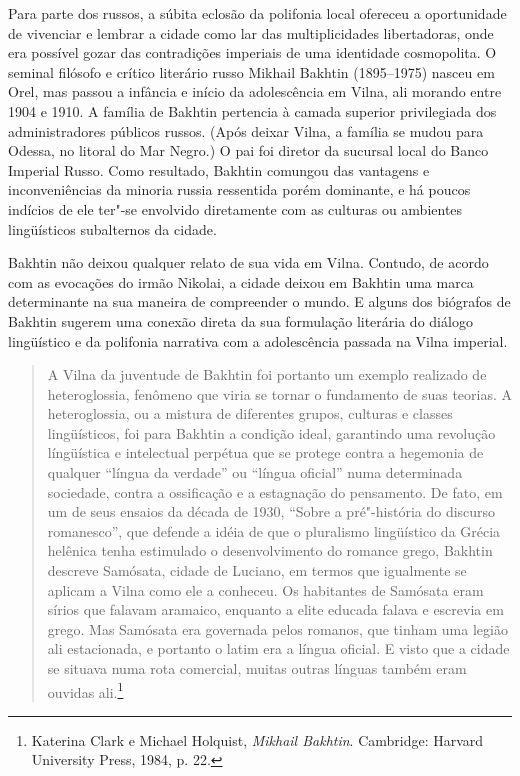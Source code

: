 Para parte dos russos, a súbita eclosão da polifonia local ofereceu a
oportunidade de vivenciar e lembrar a cidade como lar das
multiplicidades libertadoras, onde era possível gozar das contradições
imperiais de uma identidade cosmopolita. O seminal filósofo e crítico
literário russo Mikhail Bakhtin (1895--1975) nasceu em Orel, mas passou a
infância e início da adolescência em Vilna, ali morando entre 1904 e
1910. A família de Bakhtin pertencia à camada superior privilegiada dos
administradores públicos russos. (Após deixar Vilna, a família se mudou
para Odessa, no litoral do Mar Negro.) O pai foi diretor da sucursal
local do Banco Imperial Russo. Como resultado, Bakhtin comungou das
vantagens e inconveniências da minoria russia ressentida porém
dominante, e há poucos indícios de ele ter"-se envolvido diretamente com
as culturas ou ambientes lingüísticos subalternos da cidade.

Bakhtin não deixou qualquer relato de sua vida em Vilna. Contudo, de
acordo com as evocações do irmão Nikolai, a cidade deixou em Bakhtin uma
marca determinante na sua maneira de compreender o mundo. E alguns dos
biógrafos de Bakhtin sugerem uma conexão direta da sua formulação
literária do diálogo lingüístico e da polifonia narrativa com a
adolescência passada na Vilna imperial.

\begin{quote}
A Vilna da juventude de Bakhtin foi portanto um exemplo realizado de
heteroglossia, fenômeno que viria se tornar o fundamento de suas
teorias. A heteroglossia, ou a mistura de diferentes grupos, culturas e
classes lingüísticos, foi para Bakhtin a condição ideal, garantindo uma
revolução língüística e intelectual perpétua que se protege contra a
hegemonia de qualquer ``língua da verdade'' ou ``língua oficial'' numa
determinada sociedade, contra a ossificação e a estagnação do
pensamento. De fato, em um de seus ensaios da década de 1930, ``Sobre a
pré"-história do discurso romanesco'', que defende a idéia de que o
pluralismo lingüístico da Grécia helênica tenha estimulado o
desenvolvimento do romance grego, Bakhtin descreve Samósata, cidade de
Luciano, em termos que igualmente se aplicam a Vilna como ele a
conheceu. Os habitantes de Samósata eram sírios que falavam aramaico,
enquanto a elite educada falava e escrevia em grego. Mas Samósata era
governada pelos romanos, que tinham uma legião ali estacionada, e
portanto o latim era a língua oficial. E visto que a cidade se situava
numa rota comercial, muitas outras línguas também eram ouvidas
ali.\footnote{Katerina Clark e Michael Holquist, \emph{Mikhail Bakhtin}.
  Cambridge: Harvard University Press, 1984, p. 22.}
\end{quote}

